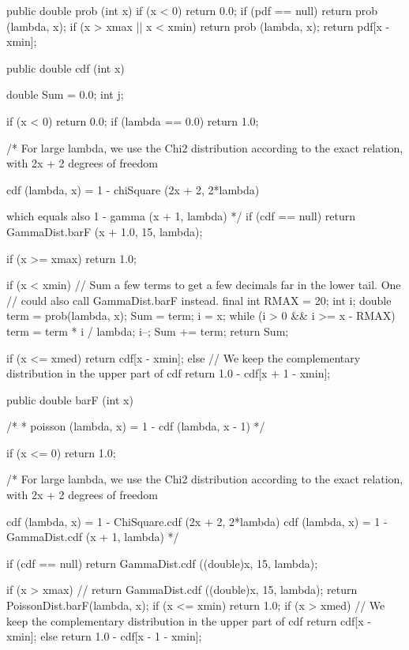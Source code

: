 \begin{code}\begin{hide}

   public double prob (int x) {
      if (x < 0)
         return 0.0;
      if (pdf == null)
         return prob (lambda, x);
      if (x > xmax || x < xmin)
         return prob (lambda, x);
      return pdf[x - xmin];
   }

   public double cdf (int x) {
      double Sum = 0.0;
      int j;

      if (x < 0)
         return 0.0;
      if (lambda == 0.0)
         return 1.0;

      /* For large lambda, we use the Chi2 distribution according to the exact
         relation, with 2x + 2 degrees of freedom

         cdf (lambda, x) = 1 - chiSquare (2x + 2, 2*lambda)

         which equals also 1 - gamma (x + 1, lambda) */
      if (cdf == null)
         return GammaDist.barF (x + 1.0, 15, lambda);

      if (x >= xmax)
         return 1.0;

      if (x < xmin) {
         // Sum a few terms to get a few decimals far in the lower tail. One
         // could also call GammaDist.barF instead.
         final int RMAX = 20;
         int i;
         double term = prob(lambda, x);
         Sum = term;
         i = x;
         while (i > 0 && i >= x - RMAX) {
            term = term * i / lambda;
            i--;
            Sum += term;
         }
         return Sum;
      }

      if (x <= xmed)
         return cdf[x - xmin];
      else
         // We keep the complementary distribution in the upper part of cdf
         return 1.0 - cdf[x + 1 - xmin];
   }


   public double barF (int x) {
      /*
       * poisson (lambda, x) = 1 - cdf (lambda, x - 1)
       */

      if (x <= 0)
         return 1.0;

      /* For large lambda,  we use the Chi2 distribution according to the exact
         relation, with 2x + 2 degrees of freedom

         cdf (lambda, x) = 1 - ChiSquare.cdf (2x + 2, 2*lambda)
         cdf (lambda, x) = 1 - GammaDist.cdf (x + 1, lambda)
       */

      if (cdf == null)
         return GammaDist.cdf ((double)x, 15, lambda);

      if (x > xmax)
//         return GammaDist.cdf ((double)x, 15, lambda);
         return PoissonDist.barF(lambda, x);
      if (x <= xmin)
         return 1.0;
      if (x > xmed)
         // We keep the complementary distribution in the upper part of cdf
         return cdf[x - xmin];
      else
         return 1.0 - cdf[x - 1 - xmin];
   }



\end{hide}
\end{code}
